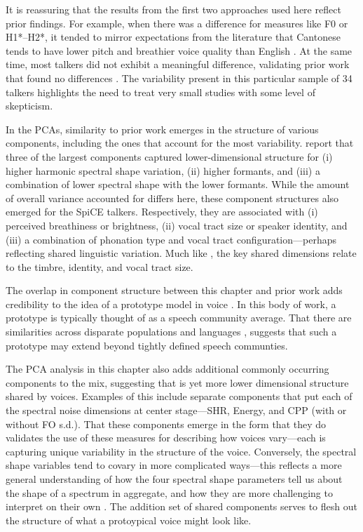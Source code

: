 It is reassuring that the results from the first two approaches used here reflect prior findings. For example, when there was a difference for measures like F0 or H1*--H2*, it tended to mirror expectations from the literature that Cantonese tends to have lower pitch and breathier voice quality than English \citep{ng_2012_ltas, ng_2010_voice}. At the same time, most talkers did not exhibit a meaningful difference, validating prior work that found no differences \citep{altenberg_2006_f0}. The variability present in this particular sample of 34 talkers highlights the need to treat very small studies with some level of skepticism.

In the PCAs, similarity to prior work emerges in the structure of various components, including the ones that account for the most variability. \citet{lee_2019_acoustic} report that three of the largest components captured lower-dimensional structure for (i) higher harmonic spectral shape variation, (ii) higher formants, and (iii) a combination of lower spectral shape with the lower formants. While the amount of overall variance accounted for differs here, these component structures also emerged for the SpiCE talkers. Respectively, they are associated with (i) perceived breathiness or brightness, (ii) vocal tract size or speaker identity, and (iii) a combination of phonation type and vocal tract configuration---perhaps reflecting shared linguistic variation. Much like \citet{lee_2019_acoustic}, the key shared dimensions relate to the timbre, identity, and vocal tract size. 

The overlap in component structure between this chapter and prior work \citep{lee_2019_acoustic,lee_2019_spontaneous,lee_2020_language} adds credibility to the idea of a prototype model in voice \citep{lavner_2001_prototype, latinus_2011_voice}. In this body of work, a prototype is typically thought of as a speech community average. That there are similarities across disparate populations and languages \citep[e.g., this chapter and][]{lee_2020_language}, suggests that such a prototype may extend beyond tightly defined speech communties. 

The PCA analysis in this chapter also adds additional commonly occurring components to the mix, suggesting that is yet more lower dimensional structure shared by voices. Examples of this include separate components that put each of the spectral noise dimensions at center stage---SHR, Energy, and CPP (with or without FO s.d.). That these components emerge in the form that they do validates the use of these measures for describing how voices vary---each is capturing unique variability in the structure of the voice. Conversely, the spectral shape variables tend to covary in more complicated ways---this reflects a more general understanding of how the four spectral shape parameters tell us about the shape of a spectrum in aggregate, and how they are more challenging to interpret on their own \citep{garellek_2019_voice}. The addition set of shared components serves to flesh out the structure of what a protoypical voice might look like. 

